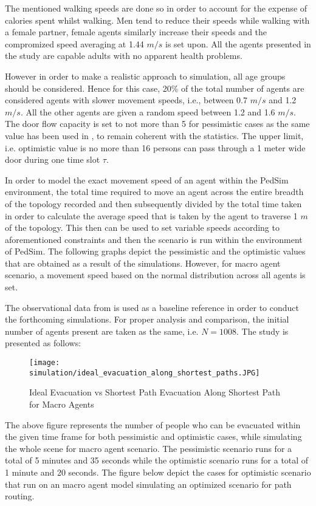 The mentioned walking speeds are done so in order to account for the expense of calories spent whilst walking. Men tend to reduce their speeds while walking with a female partner, female agents similarly increase their speeds and the compromized speed averaging at 1.44 $m/s$ is set upon. All the agents presented in the study are capable adults with no apparent health problems. 

However in order to make a realistic approach to simulation, all age groups should be considered. Hence for this case, 20\% of the total number of agents are considered agents with slower movement speeds, i.e., between 0.7 $m/s$ and 1.2 $m/s$. All the other agents are given a random speed between 1.2 and 1.6 $m/s$. The door flow capacity is set to not more than 5 for pessimistic cases as the same value has been used in \cite{ref5}, to remain coherent with the statistics. The upper limit, i.e. optimistic value is no more than 16 persons can pass through a 1 meter wide door during one time slot $\tau$. 

In order to model the exact movement speed of an agent within the PedSim environment, the total time required to move an agent across the entire breadth of the topology recorded and then subsequently divided by the total time taken in order to calculate the average speed that is taken by the agent to traverse 1 $m$ of the topology. This then can be used to set variable speeds according to aforementioned constraints and then the scenario is run within the environment of PedSim. The following graphs depict the pessimistic and the optimistic values that are obtained as a result of the simulations. However, for macro agent scenario, a movement speed based on the normal distribution across all agents is set.

The observational data from \cite{ref5} is used as a baseline reference in order to conduct the forthcoming simulations. For proper analysis and comparison, the initial number of agents present are taken as the same, i.e. $N = 1008$. The study is presented as follows:

\begin{figure}[H]
  \centering
  \texttt{[image: simulation/ideal\_evacuation\_along\_shortest\_paths.JPG]}
  \caption{Ideal Evacuation vs Shortest Path Evacuation Along Shortest Path for Macro Agents}
  \label{Ideal Evacuation vs Shortest Path Evacuation Along Shortest Path for Macro Agents}
\end{figure}

The above figure represents the number of people who can be evacuated within the given time frame for both pessimistic and optimistic cases, while simulating the whole scene for macro agent scenario. The pessimistic scenario runs for a total of 5 minutes and 35 seconds while the optimistic scenario runs for a total of 1 minute and 20 seconds. The figure below depict the cases for optimistic scenario that run on an macro agent model simulating an optimized scenario for path routing.

